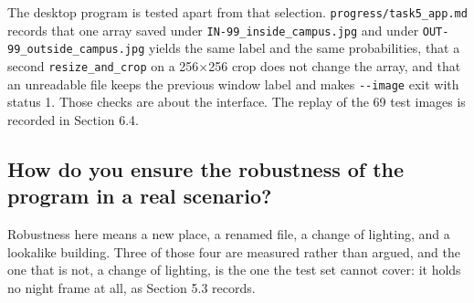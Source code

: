 \documentclass[11pt,a4paper]{article}
\begin{document}
The desktop program is tested apart from that selection. \texttt{progress/\allowbreak{}task5\_\allowbreak{}app.md} records that one array saved under \texttt{IN-\allowbreak{}99\_\allowbreak{}inside\_\allowbreak{}campus.jpg} and under \texttt{OUT-\allowbreak{}99\_\allowbreak{}outside\_\allowbreak{}campus.jpg} yields the same label and the same probabilities, that a second \texttt{resize\_\allowbreak{}and\_\allowbreak{}crop} on a 256×256 crop does not change the array, and that an unreadable file keeps the previous window label and makes \texttt{-\allowbreak{}\/\allowbreak{}-\allowbreak{}image} exit with status 1. Those checks are about the interface. The replay of the 69 test images is recorded in Section 6.4.

\subsection{How do you ensure the robustness of the program in a real scenario?}\label{how-do-you-ensure-the-robustness-of-the-program-in-a-real-scenario}

Robustness here means a new place, a renamed file, a change of lighting, and a lookalike building. Three of those four are measured rather than argued, and the one that is not, a change of lighting, is the one the test set cannot cover: it holds no night frame at all, as Section 5.3 records.
\end{document}
